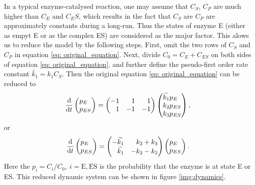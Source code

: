 	In a typical enzyme-catalysed reaction, one may assume that $C_S$, $C_P$ are much higher than $C_E$ and $C_ES$, which results in the fact that $C_S$ are $C_P$ are approximately constants during a long-run. Thus the states of enzyme E (either as empyt E or as the complex ES) are considered as the major factor. This alows us to reduce the model by the following steps. First, omit the two rows of $C_S$ and $C_P$ in equation \eqref{eq: original_equation}. Next, divide $C_0 = C_E + C_{ES}$ on both sides of equation \eqref{eq: original_equation}, and further define the pseudo-first order rate constant $\widetilde{k_1}=k_1C_S$. Then the original equation \eqref{eq: original_equation} can be reduced to
	\begin{equation}
	\dv{}{t}\begin{pmatrix*}[l] p_E \\ p_{ES} \end{pmatrix*} = 
		\begin{pmatrix*}[r]
			-1 &  1 &  1 \\
			 1 & -1 & -1 \\
		\end{pmatrix*}
		\begin{pmatrix*}[l] \widetilde{k_1}p_E \\ k_2p_{ES} \\ k_3p_{ES}\end{pmatrix*},
	\end{equation}
	or
	\begin{equation}
	\dv{}{t}\begin{pmatrix*}[l] p_E \\ p_{ES} \end{pmatrix*} = 
		\begin{pmatrix*}[r]
			-\widetilde{k_1} &  k_2+k_3 \\
			 \widetilde{k_1} & -k_2-k_3 \\
		\end{pmatrix*}
		\begin{pmatrix*}[l] p_E \\ p_{ES} \end{pmatrix*}.
	\label{eq: master_eq}
	\end{equation}
	Here the $p_i=C_i/C_0,\  i=\text{E}, \text{ES}$ is the probability that the enzyme is at state E or ES. This reduced dynamic system can be shown in figure \ref{img:dynamics}.

